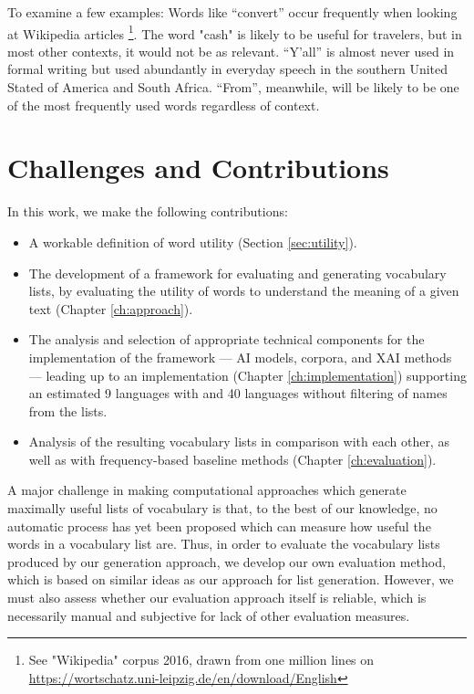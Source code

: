 To examine a few examples: Words like “convert” occur frequently when looking at Wikipedia articles \footnote{See "Wikipedia" corpus 2016, drawn from one million lines on \url{https://wortschatz.uni-leipzig.de/en/download/English}}. The word "cash" is likely to be useful for travelers, but in most other contexts, it would not be as relevant. “Y’all” is almost never used in formal writing but used abundantly in everyday speech in the southern United Stated of America and South Africa. “From”, meanwhile, will be likely to be one of the most frequently used words regardless of context.

\section{Challenges and Contributions} \label{sec:challenges-and-contributions}
In this work, we make the following contributions:

\begin{itemize}
	\item A workable definition of word utility (Section \ref{sec:utility}).
	\item The development of a framework for evaluating and generating vocabulary lists, by evaluating the utility of words to understand the meaning of a given text (Chapter \ref{ch:approach}).
	\item The analysis and selection of appropriate technical components for the implementation of the framework --- AI models, corpora, and XAI methods --- leading up to an implementation (Chapter \ref{ch:implementation}) supporting an estimated 9 languages with and 40 languages without filtering of names from the lists.
	\item Analysis of the resulting vocabulary lists in comparison with each other, as well as with frequency-based baseline methods (Chapter \ref{ch:evaluation}).
\end{itemize}

A major challenge in making computational approaches which generate maximally useful lists of vocabulary is that, to the best of our knowledge, no automatic process has yet been proposed which can measure how useful the words in a vocabulary list are. 
Thus, in order to evaluate the vocabulary lists produced by our generation approach, we develop our own evaluation method, which is based on similar ideas as our approach for list generation.
However, we must also assess whether our evaluation approach itself is reliable, which is necessarily manual and subjective for lack of other evaluation measures.

